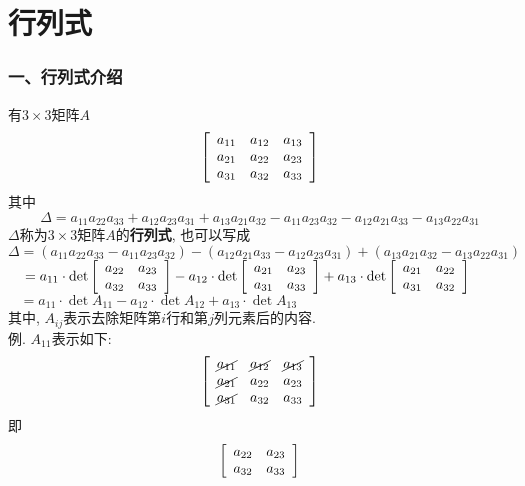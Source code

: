 % 
\part{行列式}
\section{一、行列式介绍}
有$3\times 3$矩阵$A$
\[\left[\begin{array}{l l l}
a_{11} & a_{12} & a_{13}\\
a_{21} & a_{22} & a_{23}\\
a_{31} & a_{32} & a_{33}
\end{array}\right]\]
其中
\[\Delta=a_{11}a_{22}a_{33}+a_{12}a_{23}a_{31}+a_{13}a_{21}a_{32}-a_{11}a_{23}a_{32}-a_{12}a_{21}a_{33}-a_{13}a_{22}a_{31}\]
$\Delta$称为$3\times 3$矩阵$A$的\textbf{行列式}, 也可以写成\\
$\Delta=(a_{11}a_{22}a_{33}-a_{11}a_{23}a_{32})-(a_{12}a_{21}a_{33}-a_{12}a_{23}a_{31})+(a_{13}a_{21}a_{32}-a_{13}a_{22}a_{31})$\\[1ex]
$\phantom{\Delta}=a_{11}\cdot\det\left[\begin{array}{l l}
a_{22} & a_{23}\\
a_{32} & a_{33}
\end{array}\right]-a_{12}\cdot\det\left[\begin{array}{l l}
a_{21} & a_{23}\\
a_{31} & a_{33}
\end{array}\right]+a_{13}\cdot\det\left[\begin{array}{l l}
a_{21} & a_{22}\\
a_{31} & a_{32}
\end{array}\right]$\\[1ex]
$\phantom{\Delta}=a_{11}\cdot\det A_{11}-a_{12}\cdot\det A_{12}+a_{13}\cdot\det A_{13}$\\
其中, $A_{ij}$表示去除矩阵第$i$行和第$j$列元素后的内容.\\
例. $A_{11}$表示如下:\\
\[\left[\begin{array}{l l l}
\cancel{a_{11}} & \cancel{a_{12}} & \cancel{a_{13}}\\
\cancel{a_{21}} & a_{22} & a_{23}\\
\cancel{a_{31}} & a_{32} & a_{33}
\end{array}\right]\]
即
\[\left[\begin{array}{l l}
a_{22} & a_{23}\\
a_{32} & a_{33}
\end{array}\right]\]\\[2ex]

